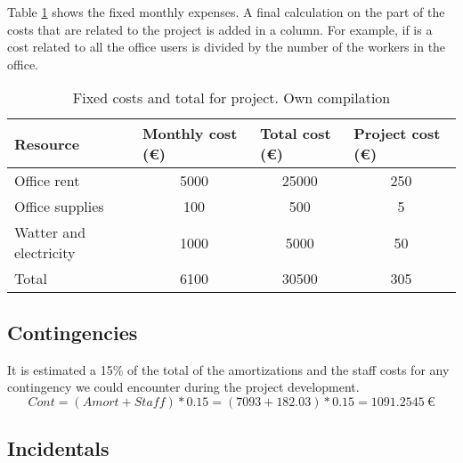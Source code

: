 \justify
Table \ref{tab:fix} shows the fixed monthly expenses. A final calculation on the part of the costs that are related to the project is added in a column. For example, if is a cost related to all the office users is divided by the number of the workers in the office.
\begin{table}[htbp!]
\centering
\begin{tabular}{|l|c|c|c|}
\hline
Resource               & \multicolumn{1}{l|}{Monthly cost (\euro)} & \multicolumn{1}{l|}{Total cost (\euro)} & \multicolumn{1}{l|}{Project cost (\euro)} \\ \hline
Office rent            & 5000                              & 25000                           & 250                               \\ \hline
Office supplies        & 100                               & 500                             & 5                                 \\ \hline
Watter and electricity & 1000                              & 5000                            & 50                                \\ \hline
Total                  & 6100                              & 30500                           & 305                               \\ \hline
\end{tabular}
\caption[Fixed costs and total for project.]{Fixed costs and total for project. Own compilation}
\label{tab:fix}
\end{table}

\subsection{Contingencies}

\justify
It is estimated a 15\% of the total of the amortizations and the staff costs for any contingency we could encounter during the project development.
\begin{equation*}
  Cont=(Amort+Staff)*0.15=(7093+182.03)*0.15=1091.2545\ \euro
\end{equation*}

\subsection{Incidentals}

